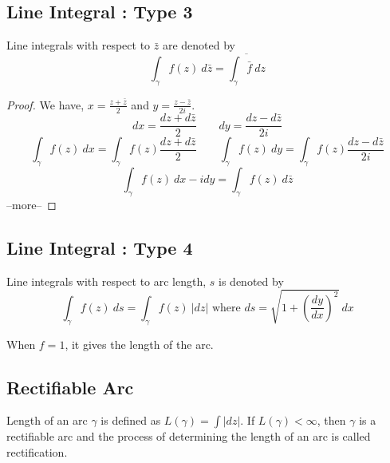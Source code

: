 \subsection{Line Integral : Type 3}
	Line integrals with respect to $\bar{z}$ are denoted by
\[ \int_\gamma f(z)\ d\bar{z} = \overline{ \int_\gamma \bar{f}\ dz} \]

\begin{proof}
We have,
$x = \frac{z+\bar{z}}{2}$ and $y = \frac{z-\bar{z}}{2i}$. 
\[ dx = \frac{dz+d\bar{z}}{2} \qquad dy = \frac{dz-d\bar{z}}{2i} \]
\[ \int_\gamma f(z)\ dx = \int_\gamma f(z) \frac{dz + d\bar{z}}{2} \qquad \int_\gamma f(z)\ dy = \int_\gamma f(z) \frac{dz-d\bar{z}}{2i} \]
\[ \int_\gamma f(z)\ dx-idy = \int_\gamma f(z)\ d\bar{z} \] --more--
\end{proof}

\subsection{Line Integral : Type 4}
 Line integrals with respect to arc length, $s$ is denoted by 
 \[ \int_\gamma f(z)\ ds  = \int_\gamma f(z)\ |dz| \text{ where } ds = \sqrt{1+\left(\frac{dy}{dx}\right)^2}\ dx \]
 
 	When $f = 1$, it gives the length of the arc.

\subsection{Rectifiable Arc}
	Length of an arc $\gamma$ is defined as $L(\gamma) = \int |dz|$.
	If $L(\gamma) < \infty$, then $\gamma$ is a rectifiable arc and the process of determining the length of an arc is called rectification.


